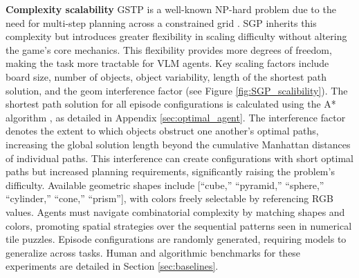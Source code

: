 \textbf{Complexity scalability}\hspace{.3cm} GSTP is a well-known NP-hard problem due to the need for multi-step planning across a constrained grid \cite{gozon2024computing}. SGP inherits this complexity but introduces greater flexibility in scaling difficulty without altering the game’s core mechanics. This flexibility provides more degrees of freedom, making the task more tractable for VLM agents. Key scaling factors include board size, number of objects, object variability, length of the shortest path solution, and the geom interference factor (see Figure \ref{fig:SGP_scalibility}). The shortest path solution for all episode configurations is calculated using the A* algorithm \cite{hart1968formal}, as detailed in Appendix \ref{sec:optimal_agent}. The interference factor denotes the extent to which objects obstruct one another’s optimal paths, increasing the global solution length beyond the cumulative Manhattan distances of individual paths. This interference can create configurations with short optimal paths but increased planning requirements, significantly raising the problem's difficulty. Available geometric shapes include [“cube,” “pyramid,” “sphere,” “cylinder,” “cone,” “prism”], with colors freely selectable by referencing RGB values. Agents must navigate combinatorial complexity by matching shapes and colors, promoting spatial strategies over the sequential patterns seen in numerical tile puzzles. Episode configurations are randomly generated, requiring models to generalize across tasks. Human and algorithmic benchmarks for these experiments are detailed in Section \ref{sec:baselines}.


